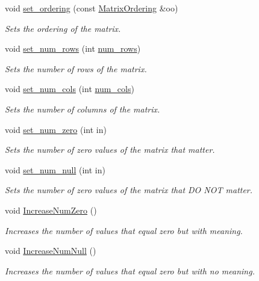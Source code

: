 \begin{DoxyCompactItemize}
void \hyperlink{classmtk_1_1Matrix_aa390fa8883e58e8f1df9416e5b5b7a83}{set\-\_\-ordering} (const \hyperlink{group__c02-enums_ga622801bd9f912d0f976c3e383f5f581c}{Matrix\-Ordering} \&oo)
\begin{DoxyCompactList}\small\item\em Sets the ordering of the matrix. \end{DoxyCompactList}\item 
void \hyperlink{classmtk_1_1Matrix_a242fedf2da10a3e5c14f63c2bc60beae}{set\-\_\-num\-\_\-rows} (int \hyperlink{classmtk_1_1Matrix_a69feb30fc0018faee65fe9f7cb43e0ed}{num\-\_\-rows})
\begin{DoxyCompactList}\small\item\em Sets the number of rows of the matrix. \end{DoxyCompactList}\item 
void \hyperlink{classmtk_1_1Matrix_a312883d34f2e0daf5db7432ee2c4ed51}{set\-\_\-num\-\_\-cols} (int \hyperlink{classmtk_1_1Matrix_a1e52243fa290de6ee4bcc48cd1776a9a}{num\-\_\-cols})
\begin{DoxyCompactList}\small\item\em Sets the number of columns of the matrix. \end{DoxyCompactList}\item 
void \hyperlink{classmtk_1_1Matrix_ae529100c5c280088e9acf8e8f7994f73}{set\-\_\-num\-\_\-zero} (int in)
\begin{DoxyCompactList}\small\item\em Sets the number of zero values of the matrix that matter. \end{DoxyCompactList}\item 
void \hyperlink{classmtk_1_1Matrix_a66c2c1c127f4efefc4a407e9552e928d}{set\-\_\-num\-\_\-null} (int in)
\begin{DoxyCompactList}\small\item\em Sets the number of zero values of the matrix that D\-O N\-O\-T matter. \end{DoxyCompactList}\item 
void \hyperlink{classmtk_1_1Matrix_a2e7c4b84d0cbf9b0122b5dc906ad1eae}{Increase\-Num\-Zero} ()
\begin{DoxyCompactList}\small\item\em Increases the number of values that equal zero but with meaning. \end{DoxyCompactList}\item 
void \hyperlink{classmtk_1_1Matrix_ac96dd5f31ebcd4388352577487cd6f11}{Increase\-Num\-Null} ()
\begin{DoxyCompactList}\small\item\em Increases the number of values that equal zero but with no meaning. \end{DoxyCompactList}\end{DoxyCompactItemize}
